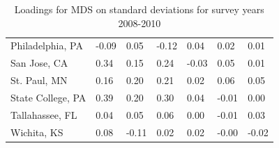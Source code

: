 \documentclass[11pt]{asaproc}
\begin{document}
\begin{table}[H]
\begin{center}
{\begin{tabular}{P{3.75cm}{r}{r}{r}{r}{r}{r}}
Philadelphia, PA & -0.09 & 0.05 & -0.12 & 0.04 & 0.02 & 0.01 \\
San Jose, CA & 0.34 & 0.15 & 0.24 & -0.03 & 0.05 & 0.01 \\
St. Paul, MN & 0.16 & 0.20 & 0.21 & 0.02 & 0.06 & 0.05 \\
State College, PA & 0.39 & 0.20 & 0.30 & 0.04 & -0.01 & 0.00 \\
Tallahassee, FL &  0.04 & 0.05 & 0.06 & 0.00 & -0.01 & 0.03 \\
Wichita, KS & 0.08 & -0.11 & 0.02 & 0.02 & -0.00 & -0.02 \\
\hline
\end{tabular}}
\caption{Loadings for MDS on standard deviations for survey years
  2008-2010}
\label{table:MDSsd}
\end{center}
\end{table}

\pagebreak
\end{document}
